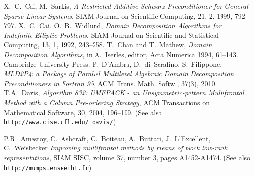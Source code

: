 \begin{thebibliography}{99}
%
%
%
X.~C.~Cai, M.~Sarkis,
{\em A Restricted Additive Schwarz Preconditioner for General Sparse Linear Systems},
SIAM Journal on Scientific Computing, 21, 2, 1999, 792--797.
%
X.~C.~Cai, O.~B.~Widlund,
{\em Domain Decomposition Algorithms for Indefinite Elliptic Problems},
SIAM Journal on Scientific and Statistical Computing, 13, 1, 1992, 243--258.
%
T.~Chan and T.~Mathew,
{\em Domain Decomposition Algorithms},
in A.~Iserles, editor, Acta Numerica 1994, 61--143.
Cambridge University Press.
%
P.~D'Ambra, D.~di~Serafino, S.~Filippone,
\emph{MLD2P4: a Package of Parallel Multilevel
Algebraic Domain Decomposition Preconditioners
in Fortran 95},  ACM Trans. Math. Softw., 37(3), 2010.
%
T.A.~Davis, 
{\em Algorithm 832: UMFPACK - an Unsymmetric-pattern Multifrontal
Method with a Column Pre-ordering Strategy},
ACM Transactions on Mathematical Software, 30, 2004, 196--199.
(See also {\tt http://www.cise.ufl.edu/~davis/})
%

P.R.~Amestoy, C.~Ashcraft, O.~Boiteau, A.~Buttari, J.~L'Excellent, C.~Weisbecker 
{\em Improving multifrontal methods by means of block low-rank representations},
SIAM SISC, volume 37, number 3, pages A1452-A1474.
(See also {\tt http://mumps.enseeiht.fr})
%


\end{thebibliography}
